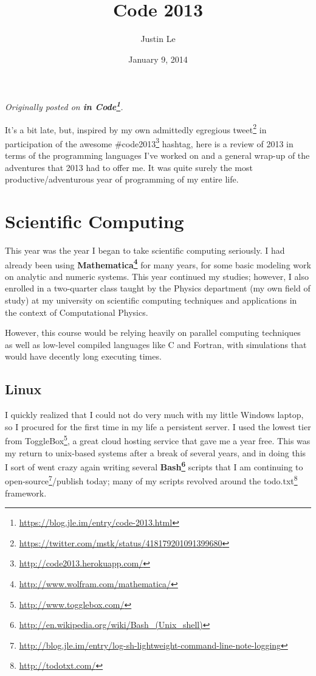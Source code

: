 \documentclass[]{article}
\title{Code 2013}
\author{Justin Le}
\date{January 9, 2014}
\renewcommand{\href}[2]{#2\footnote{\url{#1}}}
\begin{document}
\maketitle

\emph{Originally posted on
\textbf{\href{https://blog.jle.im/entry/code-2013.html}{in Code}}.}

It's a bit late, but, inspired by my own admittedly egregious
\href{https://twitter.com/mstk/status/418179201091399680}{tweet} in
participation of the awesome \href{http://code2013.herokuapp.com/}{\#code2013}
hashtag, here is a review of 2013 in terms of the programming languages I've
worked on and a general wrap-up of the adventures that 2013 had to offer me. It
was quite surely the most productive/adventurous year of programming of my
entire life.

\hypertarget{scientific-computing}{%
\section{Scientific Computing}\label{scientific-computing}}

This year was the year I began to take scientific computing seriously. I had
already been using
\textbf{\href{http://www.wolfram.com/mathematica/}{Mathematica}} for many years,
for some basic modeling work on analytic and numeric systems. This year
continued my studies; however, I also enrolled in a two-quarter class taught by
the Physics department (my own field of study) at my university on scientific
computing techniques and applications in the context of Computational Physics.

However, this course would be relying heavily on parallel computing techniques
as well as low-level compiled languages like C and Fortran, with simulations
that would have decently long executing times.

\hypertarget{linux}{%
\subsection{Linux}\label{linux}}

I quickly realized that I could not do very much with my little Windows laptop,
so I procured for the first time in my life a persistent server. I used the
lowest tier from \href{http://www.togglebox.com/}{ToggleBox}, a great cloud
hosting service that gave me a year free. This was my return to unix-based
systems after a break of several years, and in doing this I sort of went crazy
again writing several
\textbf{\href{http://en.wikipedia.org/wiki/Bash_(Unix_shell)}{Bash}} scripts
that I am continuing to
\href{http://blog.jle.im/entry/log-sh-lightweight-command-line-note-logging}{open-source}/publish
today; many of my scripts revolved around the
\href{http://todotxt.com/}{todo.txt} framework.
\end{document}
